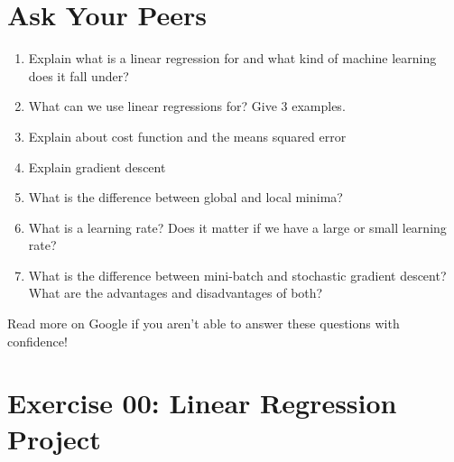 \documentclass{42-en}
\begin{document}
\chapter{Ask Your Peers}

\begin{enumerate}
    \item Explain what is a linear regression for and what kind of machine learning does it fall under?
    \item What can we use linear regressions for? Give 3 examples.
    \item Explain about cost function and the means squared error
    \item Explain gradient descent
    \item What is the difference between global and local minima?
    \item What is a learning rate? Does it matter if we have a large or small learning rate?
    \item What is the difference between mini-batch and stochastic gradient descent? What are the advantages and disadvantages of both?
\end{enumerate}

Read more on Google if you aren't able to answer these questions with confidence!

\startexercices



\chapter{Exercise 00: Linear Regression Project}

\makeheaderfiles
\end{document}
